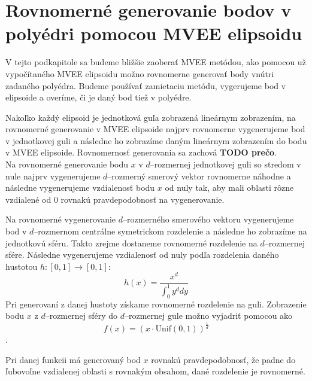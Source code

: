 \section {Rovnomerné generovanie bodov v polyédri pomocou MVEE elipsoidu}

V tejto podkapitole sa budeme bližšie zaoberať MVEE metódou, ako pomocou už vypočítaného MVEE elipsoidu možno rovnomerne generovať body vnútri zadaného polyédra. Budeme používať zamietaciu metódu, vygerujeme bod v elipsoide a overíme, či je daný bod tiež v polyédre.

Nakoľko každý elipsoid je jednotková guľa zobrazená lineárnym zobrazením, na rovnomerné generovanie v MVEE elipsoide najprv rovnomerne vygenerujeme bod v jednotkovej guli a následne ho zobrazíme daným lineárnym zobrazením do bodu v MVEE elipsoide. Rovnomernosť generovania sa zachová \textbf{TODO prečo}.\\
\label{generovanie_v_mvee}
Na rovnomerné generovanie bodu $x$ v $d$--rozmernej jednotkovej guli so stredom v nule najprv vygenerujeme $d$--rozmerný smerový vektor rovnomerne náhodne a následne vygenerujeme vzdialenosť bodu $x$ od nuly tak, aby mali oblasti rôzne vzdialené od $0$ rovnakú pravdepodobnosť na vygenerovanie.

Na rovnomerné vygenerovanie $d$--rozmerného smerového vektoru vygenerujeme bod v $d$--rozmernom centrálne symetrickom rozdelenie a následne ho zobrazíme na jednotkovú sféru. Takto zrejme dostaneme rovnomerné rozdelenie na $d$--rozmernej sfére. Následne vygenerujeme vzdialenosť od nuly podľa rozdelenia daného hustotou $h:[0,1] \rightarrow [0,1]$: $$h(x)=\frac{x^d}{\int_0^1 y^d dy}$$
Pri generovaní z danej hustoty získame rovnomerné rozdelenie na guli. Zobrazenie bodu $x$ z $d$--rozmernej sféry do $d$--rozmernej gule možno vyjadriť pomocou  ako $$f(x)=(x\cdot\text{Unif}(0,1))^{\frac{1}{d}}$$.

Pri danej funkcii má generovaný bod $x$ rovnakú pravdepodobnosť, že padne do ľubovoľne vzdialenej oblasti s rovnakým obsahom, dané rozdelenie je rovnomerné.